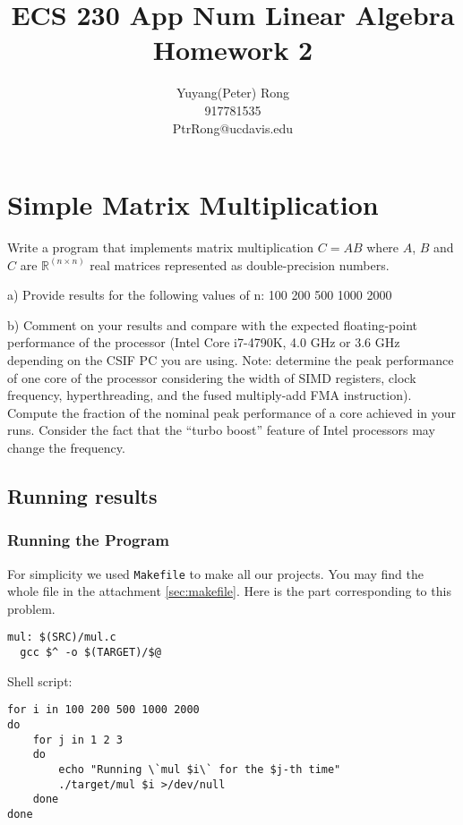 \documentclass[12pt]{article}
\title{ECS 230 App Num Linear Algebra \\ Homework 2}
\author{Yuyang(Peter) Rong \\917781535 \\ PtrRong@ucdavis.edu}
\begin{document}
\maketitle

\section{Simple Matrix Multiplication}
Write a program that implements matrix multiplication $C=AB$ where $A$, $B$ and $C$ are $\mathbb{R}^{(n \times n)}$ real matrices represented as double-precision numbers.

a) Provide results for the following values of n: 100 200 500 1000 2000

b) Comment on your results and compare with the expected floating-point performance of
the processor (Intel Core i7-4790K, 4.0 GHz or 3.6 GHz depending on the CSIF PC you are
using. Note: determine the peak performance of one core of the processor considering the
width of SIMD registers, clock frequency, hyperthreading, and the fused multiply-add FMA
instruction). Compute the fraction of the nominal peak performance of a core achieved in
your runs. Consider the fact that the “turbo boost” feature of Intel processors may change
the frequency.



\subsection{Running results}

\subsubsection{Running the Program}
For simplicity we used \texttt{Makefile} to make all our projects.
You may find the whole file in the attachment \autoref{sec:makefile}.
Here is the part corresponding to this problem.
\begin{lstlisting}
mul: $(SRC)/mul.c
  gcc $^ -o $(TARGET)/$@
        \end{lstlisting}

Shell script:
\begin{lstlisting}
for i in 100 200 500 1000 2000
do
    for j in 1 2 3
    do
        echo "Running \`mul $i\` for the $j-th time"
        ./target/mul $i >/dev/null
    done
done
\end{lstlisting}
\end{document}
